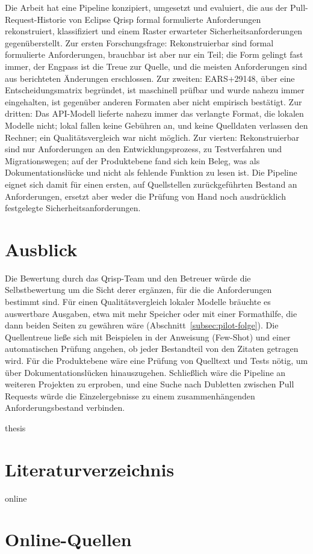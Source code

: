 \documentclass[11pt,a4paper]{report}
\begin{document}
Die Arbeit hat eine Pipeline konzipiert, umgesetzt und evaluiert, die
aus der Pull-Request-Historie von Eclipse Qrisp formal formulierte
Anforderungen rekonstruiert, klassifiziert und einem Raster erwarteter
Sicherheitsanforderungen gegenüberstellt. Zur ersten Forschungsfrage:
Rekonstruierbar sind formal formulierte Anforderungen, brauchbar ist
aber nur ein Teil; die Form gelingt fast immer, der Engpass ist die Treue
zur Quelle, und die meisten Anforderungen sind aus berichteten
Änderungen erschlossen. Zur zweiten: EARS+29148, über eine
Entscheidungsmatrix begründet, ist maschinell prüfbar und wurde nahezu
immer eingehalten, ist gegenüber anderen Formaten aber nicht empirisch
bestätigt. Zur dritten: Das API-Modell lieferte nahezu immer das
verlangte Format, die lokalen Modelle nicht; lokal fallen keine Gebühren
an, und keine Quelldaten verlassen den Rechner; ein Qualitätsvergleich
war nicht möglich. Zur vierten: Rekonstruierbar sind nur Anforderungen an
den Entwicklungsprozess, zu Testverfahren und Migrationswegen; auf der
Produktebene fand sich kein Beleg, was als Dokumentationslücke und nicht
als fehlende Funktion zu lesen ist. Die Pipeline eignet sich damit für
einen ersten, auf Quellstellen zurückgeführten Bestand an Anforderungen,
ersetzt aber weder die Prüfung von Hand noch ausdrücklich festgelegte
Sicherheitsanforderungen.

\section{Ausblick}
\label{sec:ausblick}

Die Bewertung durch das Qrisp-Team und den Betreuer würde die
Selbstbewertung um die Sicht derer ergänzen, für die die Anforderungen
bestimmt sind. Für einen Qualitätsvergleich lokaler Modelle bräuchte es
auswertbare Ausgaben, etwa mit mehr Speicher oder mit einer Formathilfe,
die dann beiden Seiten zu gewähren wäre
(Abschnitt~\ref{subsec:pilot-folge}). Die Quellentreue ließe sich mit
Beispielen in der Anweisung (Few-Shot) und einer automatischen Prüfung
angehen, ob jeder Bestandteil von den Zitaten getragen wird. Für die
Produktebene wäre eine Prüfung von Quelltext und Tests nötig, um über
Dokumentationslücken hinauszugehen. Schließlich wäre die Pipeline an
weiteren Projekten zu erproben, und eine Suche nach Dubletten zwischen
Pull Requests würde die Einzelergebnisse zu einem zusammenhängenden
Anforderungsbestand verbinden.


\begin{btSect}{thesis} %
\section*{Literaturverzeichnis}
\btPrintCited
\end{btSect}
\begin{btSect}{online}
\section*{Online-Quellen}
\btPrintCited
\end{btSect}
\end{document}
